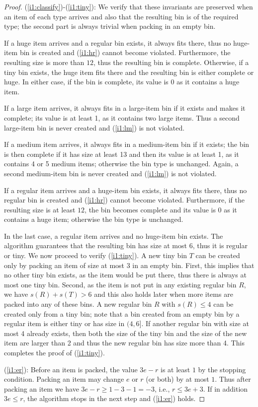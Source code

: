 \begin{proof}
(\ref{i1:classify})-(\ref{i1:tiny}): We verify that these invariants
  are preserved when an item of each type arrives and also that the
  resulting bin is of the required type; the second part is always
  trivial when packing in an empty bin.

If a huge item arrives and a regular bin exists, it always fits there,
thus no huge-item bin is created and (\ref{i1:hr}) cannot become
violated. Furthermore, the resulting size is more than $12$, thus the
resulting bin is complete. Otherwise, if a tiny bin exists, the huge
item fits there and the resulting bin is either complete or huge. In
either case, if the bin is complete, its value is 0 as it contains a
huge item.

If a large item arrives, it always fits in a large-item bin if it
exists and makes it complete; its value is at least 1, as it contains
two large items. Thus a second large-item bin is never
created and (\ref{i1:lm}) is not violated.

If a medium item arrives, it always fits in a medium-item bin if it
exists; the bin is then complete if it has size at least 13 and then
its value is at least 1, as it contains 4 or 5 medium items; otherwise
the bin type is unchanged. Again, a second medium-item bin is never
created and (\ref{i1:lm}) is not violated.

If a regular item arrives and a huge-item bin exists, it always fits
there, thus no regular bin is created and (\ref{i1:hr}) cannot become
violated. Furthermore, if the resulting size is at least $12$, the bin
becomes complete and its value is 0 as it contains a huge item; otherwise
the bin type is unchanged.

In the last case, a regular item arrives and no huge-item bin exists.
The algorithm guarantees that the resulting bin has size at most 6,
thus it is regular or tiny. We now proceed to verify
(\ref{i1:tiny}). A new tiny bin $T$ can be created only by packing an
item of size at most 3 in an empty bin. First, this implies that no
other tiny bin exists, as the item would be put there, thus there is
always at most one tiny bin. Second, as the item is not put in any
existing regular bin $R$, we have $s(R)+s(T)>6$ and this also holds
later when more items are packed into any of these bins. A new regular
bin $R$ with $s(R)\leq 4$ can be created only from a tiny bin; note
that a bin created from an empty bin by a regular item is either tiny
or has size in $(4,6]$. If another regular bin with size at most 4
  already exists, then both the size of the tiny bin and the size of
  the new item are larger than 2 and thus the new regular bin has size
  more than 4. This completes the proof of (\ref{i1:tiny}). 

(\ref{i1:er}): Before an item is packed, the value $3e-r$ is at least
  $1$ by the stopping condition. Packing an item may change $e$ or $r$ (or both) by at most $1$. Thus after
  packing an item we have $3e-r\geq 1-3-1=-3$, i.e., $r\leq 3e+3$. If
  in addition $3e\leq r$, the algorithm stops in the next step and
  (\ref{i1:er}) holds.
\end{proof}


